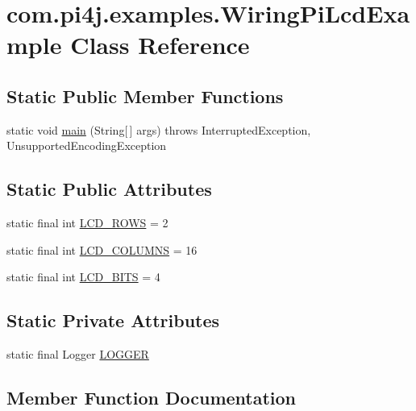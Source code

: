 \hypertarget{classcom_1_1pi4j_1_1examples_1_1WiringPiLcdExample}{}\section{com.\+pi4j.\+examples.\+Wiring\+Pi\+Lcd\+Example Class Reference}
\label{classcom_1_1pi4j_1_1examples_1_1WiringPiLcdExample}
\subsection*{Static Public Member Functions}
\begin{DoxyCompactItemize}
\item 
static void \hyperlink{classcom_1_1pi4j_1_1examples_1_1WiringPiLcdExample_a2594cc9fe55ea4909c9dbde59351a503}{main} (String\mbox{[}$\,$\mbox{]} args)  throws Interrupted\+Exception,             Unsupported\+Encoding\+Exception 
\end{DoxyCompactItemize}
\subsection*{Static Public Attributes}
\begin{DoxyCompactItemize}
\item 
static final int \hyperlink{classcom_1_1pi4j_1_1examples_1_1WiringPiLcdExample_a821e07d27f9a2ba9115e88fd45c57167}{L\+C\+D\+\_\+\+R\+O\+W\+S} = 2
\item 
static final int \hyperlink{classcom_1_1pi4j_1_1examples_1_1WiringPiLcdExample_a11853a21d0735237fd70ec53d72da15b}{L\+C\+D\+\_\+\+C\+O\+L\+U\+M\+N\+S} = 16
\item 
static final int \hyperlink{classcom_1_1pi4j_1_1examples_1_1WiringPiLcdExample_abfb49a3709d767f18ced72aa9720a4fe}{L\+C\+D\+\_\+\+B\+I\+T\+S} = 4
\end{DoxyCompactItemize}
\subsection*{Static Private Attributes}
\begin{DoxyCompactItemize}
\item 
static final Logger \hyperlink{classcom_1_1pi4j_1_1examples_1_1WiringPiLcdExample_ab24da6409b7984edeb55902dbd5e3f8f}{L\+O\+G\+G\+E\+R}
\end{DoxyCompactItemize}


\subsection{Member Function Documentation}
\hypertarget{classcom_1_1pi4j_1_1examples_1_1WiringPiLcdExample_a2594cc9fe55ea4909c9dbde59351a503}{}
